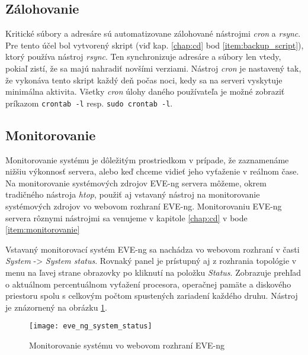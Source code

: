 \subsection{Zálohovanie}
\label{chap:zalohovanie}

Kritické súbory a adresáre sú automatizovane zálohované nástrojmi \emph{cron} a \emph{rsync}. Pre tento účel bol vytvorený skript (viď kap. \ref{chap:cd} bod \ref{item:backup_script}), ktorý používa nástroj \emph{rsync}. Ten synchronizuje adresáre a súbory len vtedy, pokiaľ zistí, že sa majú nahradiť novšími verziami. Nástroj \emph{cron} je nastavený tak, že vykonáva tento skript každý deň počas noci, kedy sa na serveri vyskytuje minimálna aktivita. Všetky \emph{cron} úlohy daného používateľa je možné zobraziť príkazom \texttt{crontab -l} resp. \texttt{sudo crontab -l}.





\subsection{Monitorovanie}

Monitorovanie systému je dôležitým prostriedkom v prípade, že zaznamenáme nižšiu výkonnosť servera, alebo keď chceme vidieť jeho vyťaženie v reálnom čase. Na monitorovanie systémových zdrojov EVE-ng servera môžeme, okrem tradičného nástroja \emph{htop}, použiť aj vstavaný nástroj na monitorovanie systémových zdrojov vo webovom rozhraní EVE-ng. Monitorovaniu EVE-ng servera rôznymi nástrojmi sa venujeme v kapitole \ref{chap:cd} v bode \ref{item:monitorovanie}

Vstavaný monitorovací systém EVE-ng sa nachádza vo webovom rozhraní v časti \emph{System} -> \emph{System status}. Rovnaký panel je prístupný aj z rozhrania topológie v menu na ľavej strane obrazovky po kliknutí na položku \emph{Status}. Zobrazuje prehľad o aktuálnom percentuálnom vyťažení procesora, operačnej pamäte a diskového priestoru spolu s celkovým počtom spustených zariadení každého druhu. Nástroj je znázornený na obrázku \ref{obr:eve_ng_system_status}.

\begin{figure}
    \centering
    \texttt{[image: eve\_ng\_system\_status]}
    \caption{Monitorovanie systému vo webovom rozhraní EVE-ng}
    \label{obr:eve_ng_system_status}
\end{figure}





